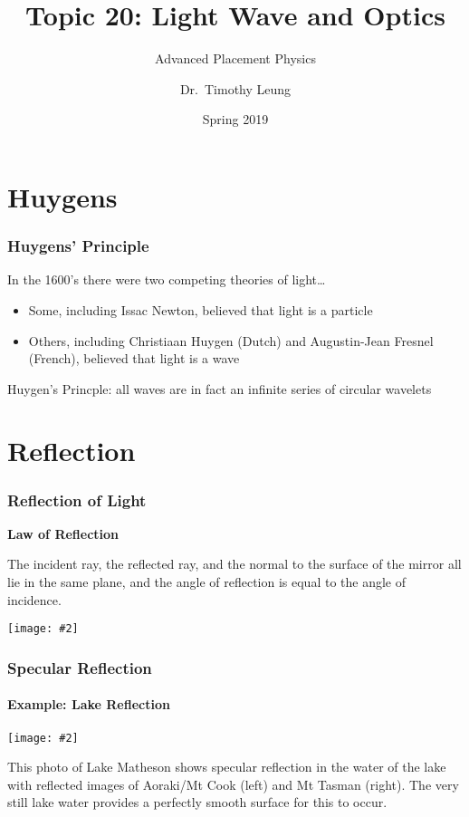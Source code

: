 \documentclass[compress,aspectratio=169]{beamer}
\title{Topic 20: Light Wave and Optics}
\subtitle{Advanced Placement Physics}
\author[TML]{Dr.\ Timothy Leung}
\institute{Olympiads School}
\date{Spring 2019}
\newcommand{\pic}[2]{\texttt{[image: \#2]}}
\begin{document}
\begin{frame}
  \maketitle
\end{frame}


\section{Huygens}
\begin{frame}
  \frametitle{Huygens' Principle}
  In the 1600's there were two competing theories of light\ldots
  \begin{itemize}
  \item Some, including Issac Newton, believed that  light is a particle
  \item Others, including Christiaan Huygen (Dutch) and Augustin-Jean Fresnel
    (French), believed that light is a wave
  \end{itemize}

  \vspace{.4in}Huygen's Princple: all waves are in fact an infinite series of
  circular wavelets
\end{frame}

\section{Reflection}
\begin{frame}
  \frametitle{Reflection of Light}
  \textbf{Law of Reflection}

  The incident ray, the reflected ray, and the normal to the surface of the
  mirror all lie in the same plane, and the angle of reflection is equal to
  the angle of incidence.  
  \begin{center}
    \pic{.7}{Types-of-reflection.jpg}
  \end{center}
\end{frame}

\begin{frame}
  \frametitle{Specular Reflection}
  \framesubtitle{Example: Lake Reflection}
  \begin{center}
    \pic{.55}{Lake-reflection.jpg}
  \end{center}
  This photo of Lake Matheson shows specular reflection in the water of the
  lake with reflected images of Aoraki/Mt Cook (left) and Mt Tasman (right).
  The very still lake water provides a perfectly smooth surface for this to
  occur.
\end{frame}
\end{document}
